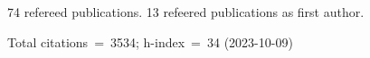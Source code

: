 74 refereed publications. 13 refeered publications as first author.

Total citations~=~3534; h-index~=~34 (2023-10-09)